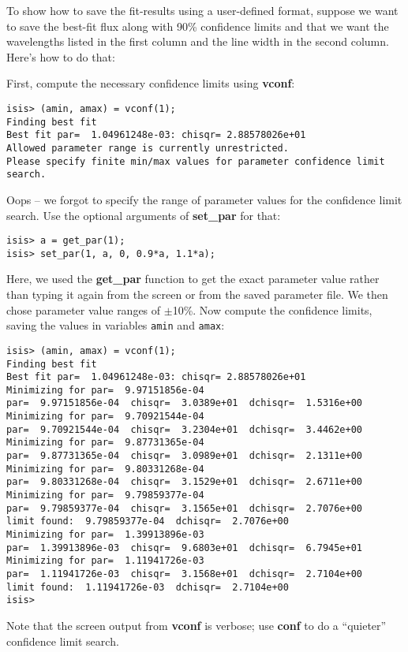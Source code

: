 \documentclass{book}
\begin{document}
{To show how to save the fit-results using a user-defined format,
suppose we want to save the best-fit flux along with 90\%
confidence limits and that we want the wavelengths listed in the
first column and the line width in the second column.  Here's how
to do that:

First, compute the necessary confidence limits using {\bf vconf}:
\begin{verbatim}
isis> (amin, amax) = vconf(1);
Finding best fit
Best fit par=  1.04961248e-03: chisqr= 2.88578026e+01
Allowed parameter range is currently unrestricted.
Please specify finite min/max values for parameter confidence limit search.
\end{verbatim}
Oops -- we forgot to specify the range of parameter values for the
confidence limit search. Use the optional arguments of {\bf
set\_par} for that:
\begin{verbatim}
isis> a = get_par(1);
isis> set_par(1, a, 0, 0.9*a, 1.1*a);
\end{verbatim}
Here, we used the {\bf get\_par} function to get the exact parameter value rather
than typing it again from the screen or from the saved parameter file.  We then
chose parameter value ranges of $\pm$10\%.  Now compute the
confidence limits, saving the values in variables {\tt amin} and {\tt amax}:
\begin{verbatim}
isis> (amin, amax) = vconf(1);
Finding best fit
Best fit par=  1.04961248e-03: chisqr= 2.88578026e+01
Minimizing for par=  9.97151856e-04
par=  9.97151856e-04  chisqr=  3.0389e+01  dchisqr=  1.5316e+00
Minimizing for par=  9.70921544e-04
par=  9.70921544e-04  chisqr=  3.2304e+01  dchisqr=  3.4462e+00
Minimizing for par=  9.87731365e-04
par=  9.87731365e-04  chisqr=  3.0989e+01  dchisqr=  2.1311e+00
Minimizing for par=  9.80331268e-04
par=  9.80331268e-04  chisqr=  3.1529e+01  dchisqr=  2.6711e+00
Minimizing for par=  9.79859377e-04
par=  9.79859377e-04  chisqr=  3.1565e+01  dchisqr=  2.7076e+00
limit found:  9.79859377e-04  dchisqr=  2.7076e+00
Minimizing for par=  1.39913896e-03
par=  1.39913896e-03  chisqr=  9.6803e+01  dchisqr=  6.7945e+01
Minimizing for par=  1.11941726e-03
par=  1.11941726e-03  chisqr=  3.1568e+01  dchisqr=  2.7104e+00
limit found:  1.11941726e-03  dchisqr=  2.7104e+00
isis>
\end{verbatim}
Note that the screen output from {\bf vconf} is verbose;
use {\bf conf} to do a ``quieter'' confidence limit search.

}
\end{document}
